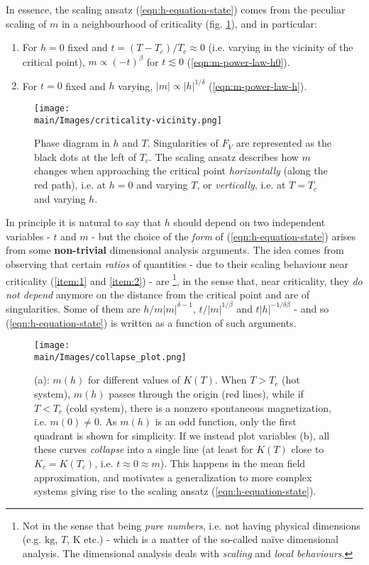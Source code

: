 \documentclass[../../main.tex]{subfiles}
\begin{document}
In essence, the scaling ansatz (\ref{eqn:h-equation-state}) comes from the peculiar scaling of $m$ in a neighbourhood of criticality (fig. \ref{fig:criticality-vicinity}), and in particular: 
\begin{enumerate}[label=\alph*)]
    \item \label{item:1} For $h=0$ fixed and $t = (T-T_c)/T_c \approx 0$ (i.e. varying in the vicinity of the critical point), $m \propto (-t)^\beta$ for $t \lesssim 0$ (\ref{eqn:m-power-law-h0}).
    \item \label{item:2} For $t=0$ fixed and $h$ varying, $|m| \propto |h|^{1/\delta}$ (\ref{eqn:m-power-law-h}).
\end{enumerate} 

\begin{figure}[H]
    \centering
    \texttt{[image: \\main/Images/criticality-vicinity.png]}
    \caption{Phase diagram in $h$ and $T$. Singularities of $F_V$ are represented as the black dots at the left of $T_c$. The scaling ansatz describes how $m$ changes when approaching the critical point \textit{horizontally} (along the red path), i.e. at $h=0$ and varying $T$, or \textit{vertically}, i.e. at $T = T_c$ and varying $h$.}
    \label{fig:criticality-vicinity}
\end{figure}

In principle it is natural to say that $h$ should depend on two independent variables - $t$ and $m$ - but the choice of the \textit{form} of (\ref{eqn:h-equation-state}) arises from some \textbf{non-trivial} dimensional analysis arguments. The idea comes from observing that certain \textit{ratios} of quantities - due to their scaling behaviour near criticality (\ref{item:1} and \ref{item:2}) - are \footnote{Not in the sense that being \textit{pure numbers}, i.e. not having physical dimensions (e.g. $\si{\kilo\g}$, $\si{T}$, $\si{\K}$ etc.) - which is a matter of the so-called na\"ive dimensional analysis. The  dimensional analysis deals with \textit{scaling} and \textit{local behaviours}.}, in the sense that, near criticality, they \textit{do not depend} anymore on the distance from the critical point and are  of singularities. Some of them are $h/m|m|^{\delta-1}$, $t/|m|^{1/\beta}$ and $t|h|^{-1/\delta \beta}$ - and so (\ref{eqn:h-equation-state}) is written as a function of such arguments.


\begin{figure}[H]
    \centering
    \texttt{[image: \\main/Images/collapse\_plot.png]}
    \caption{(a): $m(h)$ for different values of $K(T)$. When $T > T_c$ (hot system), $m(h)$ passes through the origin (red lines), while if $T < T_c$ (cold system), there is a nonzero spontaneous magnetization, i.e. $m(0) \neq 0$. As $m(h)$ is an odd function, only the first quadrant is shown for simplicity. If we instead plot  variables (b), all these curves \textit{collapse} into a single line (at least for $K(T)$ close to $K_c = K(T_c)$, i.e. $t \approx 0 \approx m$). This happens in the mean field approximation, and motivates a generalization to more complex systems giving rise to the scaling ansatz (\ref{eqn:h-equation-state}).}
    \label{fig:collapse_plot}
\end{figure}
\end{document}
